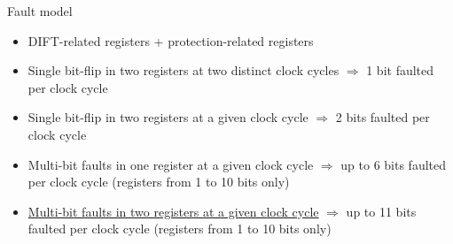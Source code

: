 \begin{frame}{Fault model}
    \begin{block}{}
        \begin{itemize}
            \item DIFT-related registers + protection-related registers
            \item Single bit-flip in two registers at two distinct clock cycles {\footnotesize$\Rightarrow$ 1 bit faulted per clock cycle}
            \item Single bit-flip in two registers at a given clock cycle {\footnotesize$\Rightarrow$ 2 bits faulted per clock cycle}
            \item Multi-bit faults in one register at a given clock cycle {\footnotesize$\Rightarrow$ up to 6 bits faulted per clock cycle} {\tiny (registers from 1 to 10 bits only)}
            \item \underline{Multi-bit faults in two registers at a given clock cycle} {\footnotesize$\Rightarrow$ up to 11 bits faulted per clock cycle} {\tiny (registers from 1 to 10 bits only)}
        \end{itemize}
    \end{block}
\end{frame}
